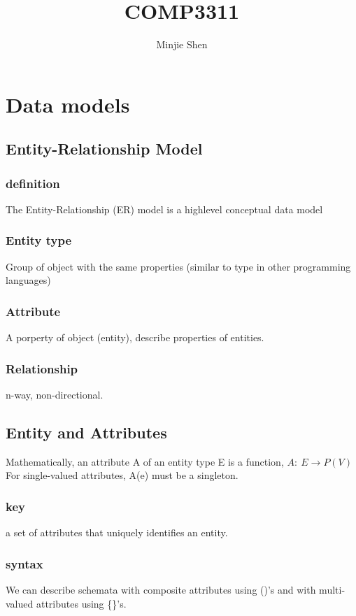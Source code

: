 \documentclass[a4paper]{scrartcl}
\title{COMP3311}
\author{Minjie Shen}
\begin{document}
  \maketitle

\section{Data models}
  \subsection{Entity-Relationship Model}
    \subsubsection{definition}
      The Entity-Relationship (ER) model is a highlevel conceptual data model\\
    \subsubsection{Entity type}
      Group of object with the same properties (similar to type in other programming languages)
    \subsubsection{Attribute}
      A porperty of object (entity), describe properties of entities.
    \subsubsection{Relationship}
      n-way, non-directional.
  \subsection{Entity and Attributes}
    Mathematically, an attribute A of an entity type E is a function, $A:~E \rightarrow P(V)$\\
    For single-valued attributes, A(e) must be a singleton.
    \subsubsection{key}
      a set of attributes that uniquely identifies an entity.
    \subsubsection{syntax}
      We can describe schemata with composite attributes using ()’s and with multi-valued attributes using \{\}’s.
\end{document}
